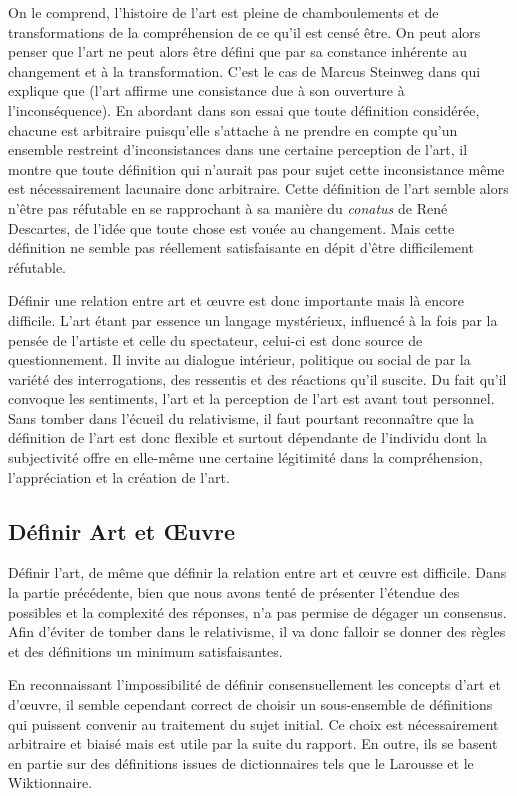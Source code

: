 \documentclass[12pt]{article} %
\begin{document}
On le comprend, l'histoire de l'art est pleine de chamboulements et de transformations de la compréhension de ce qu'il est censé être. On peut alors penser que l'art ne peut alors être défini que par sa constance inhérente au changement et à la transformation. C'est le cas de Marcus Steinweg dans  qui explique que  (l'art affirme une consistance due à son ouverture à l'inconséquence). En abordant dans son essai que toute définition considérée, chacune est arbitraire puisqu'elle s'attache à ne prendre en compte qu'un ensemble restreint d'inconsistances dans une certaine perception de l'art, il montre que toute définition qui n'aurait pas pour sujet cette inconsistance même est nécessairement lacunaire donc arbitraire. Cette définition de l'art semble alors n'être pas réfutable en se rapprochant à sa manière du \textit{conatus} de René Descartes, de l'idée que toute chose est vouée au changement. Mais cette définition ne semble pas  réellement satisfaisante en dépit d'être difficilement réfutable.

Définir une relation entre art et œuvre est donc importante mais là encore difficile.  L'art étant par essence un langage mystérieux, influencé à la fois par la pensée de l'artiste et celle du spectateur, celui-ci est donc source de questionnement. Il invite au dialogue intérieur, politique ou social de par la variété des interrogations, des ressentis et des réactions qu'il suscite. Du fait qu'il convoque les sentiments, l'art et la perception de l'art est avant tout personnel. Sans tomber dans l'écueil du relativisme, il faut pourtant reconnaître que la définition de l'art est donc flexible et surtout dépendante de l'individu dont la subjectivité offre en elle-même une certaine légitimité dans la compréhension, l'appréciation et la création de l'art. 

\subsection{Définir Art et Œuvre}
Définir l'art, de même que définir la relation entre art et œuvre est difficile. Dans la partie précédente, bien que nous avons tenté de présenter l'étendue des possibles et la complexité des réponses, n'a pas permise de dégager un consensus. Afin d'éviter de tomber dans le relativisme, il va donc falloir se donner des règles et des définitions un minimum satisfaisantes. 

En reconnaissant l'impossibilité de définir consensuellement les concepts d'art et d'œuvre, il semble cependant correct de choisir un sous-ensemble de définitions qui puissent convenir au traitement du sujet initial. Ce choix est nécessairement arbitraire et biaisé mais est utile par la suite du rapport. En outre, ils se basent en partie sur des définitions issues de dictionnaires tels que le Larousse et le Wiktionnaire.
\end{document}
